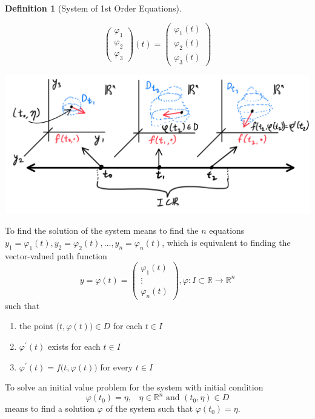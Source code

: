 \documentclass{article}
\theoremstyle{remark}
\theoremstyle{definition}
\newtheorem{definition}{Definition}[section]
\begin{document}
\begin{definition}[System of 1st Order Equations]
\begin{enumerate}
\[\begin{pmatrix}
        \varphi_1 \\ \varphi_2 \\ \varphi_3 \end{pmatrix} (t) = \begin{pmatrix}
        \varphi_1 (t)\\ \varphi_2(t) \\ \varphi_3(t) \end{pmatrix}\]
         \begin{center}
            \includegraphics[scale=0.26]{img/System_w_n_dim_Phase_Space.PNG}
        \end{center}
    \end{enumerate}
    To find the solution of the system means to find the $n$ equations $y_1 = \varphi_1 (t), y_2 = \varphi_2 (t), \ldots, y_n = \varphi_n (t)$, which is equivalent to finding the vector-valued path function 
    \[y = \varphi(t) = \begin{pmatrix} \varphi_1 (t) \\ \vdots \\ \varphi_n (t) \end{pmatrix}, \varphi: I \subset \mathbb{R} \longrightarrow \mathbb{R}^n\]
    such that
    \begin{enumerate}
        \item the point $\big(t, \varphi(t)\big) \in D$ for each $t \in I$
        \item $\varphi^\prime (t)$ exists for each $t \in I$
        \item $\varphi^\prime (t) = f \big( t, \varphi(t)\big)$ for every $t \in I$ 
    \end{enumerate}
    To solve an initial value problem for the system with initial condition 
    \[\varphi(t_0) = \eta, \;\;\; \eta \in \mathbb{R}^n \text{ and } (t_0, \eta) \in D\]
    means to find a solution $\varphi$ of the system such that $\varphi(t_0) = \eta$. 
    \end{definition}
\end{document}
